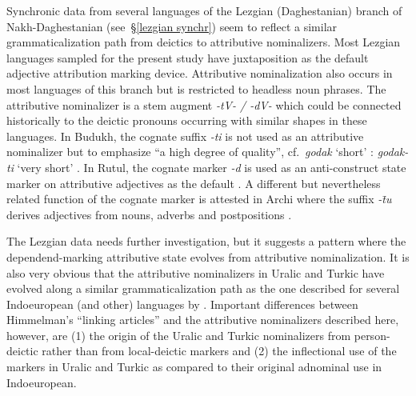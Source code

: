 {Synchronic data from several languages of the Lezgian (Daghestanian) branch of Nakh-Daghestanian (see~\S\ref{lezgian synchr}) seem to reflect a similar grammaticalization path from deictics to attributive nominalizers. Most Lezgian languages sampled for the present study have juxtaposition as the default adjective attribution marking device. Attributive nominalization also occurs in most languages of this branch but is restricted to headless noun phrases. The attributive nominalizer is a stem augment \textit{-tV- / -dV-} which could be connected historically to the deictic pronouns occurring with similar shapes in these languages. In Budukh, the cognate suffix \textit{-ti} is not used as an attributive nominalizer but to emphasize “a high degree of quality”, cf.~\textit{godak} ‘short’ : \textit{godak-ti} ‘very short’ \citep[267]{alekseev1994b}. In Rutul, the cognate marker \textit{-d} is used as an anti-construct state marker on attributive adjectives as the default \citep[224]{alekseev1994a}. A different but nevertheless related function of the cognate marker is attested in Archi where the suffix \textit{-t̄u} derives adjectives from nouns, adverbs and postpositions \citep[318]{kibrik1994b}.

The Lezgian data needs further investigation, but it suggests a pattern where the dependend-marking attributive state evolves from attributive nominalization. It is also very obvious that the attributive nominalizers in Uralic and Turkic have evolved along a similar grammaticalization path as the one described for several Indoeuropean (and other) languages by \cite{himmelmann1997}. Important differences between Himmelman's “linking articles” and the attributive nominalizers described here, however, are (1) the origin of the Uralic and Turkic nominalizers from person-deictic rather than from local-deictic markers and (2) the inflectional use of the markers in Uralic and Turkic as compared to their original adnominal use in Indoeuropean.

}
